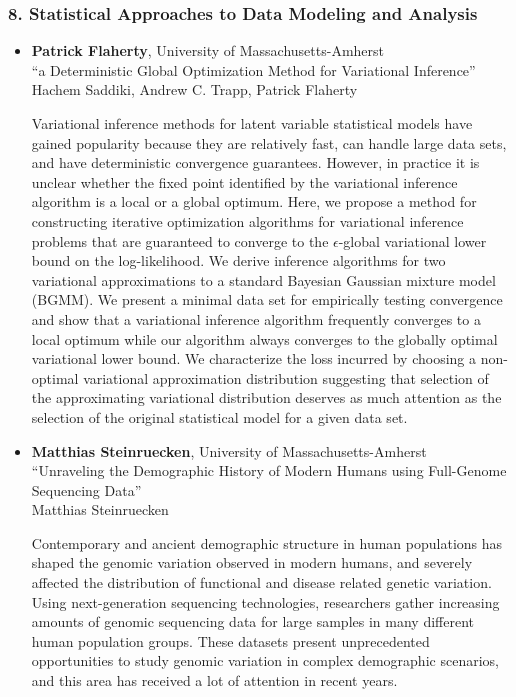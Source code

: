 \subsubsection*{8. Statistical Approaches to Data Modeling and Analysis}

\begin{itemize}
\item \textbf{Patrick Flaherty}, University of Massachusetts-Amherst \\
``a Deterministic Global Optimization Method for Variational Inference'' \\
Hachem Saddiki, Andrew C. Trapp, Patrick Flaherty


Variational inference methods for latent variable statistical models have gained popularity because they are relatively fast, can handle large data sets, and have deterministic convergence guarantees.
However, in practice it is unclear whether the fixed point identified by the variational inference algorithm is a local or a global optimum.
Here, we propose a method for constructing iterative optimization algorithms for variational inference problems that are guaranteed to converge to the $\epsilon$-global variational lower bound on the log-likelihood.
We derive inference algorithms for two variational approximations to a standard Bayesian Gaussian mixture model (BGMM).
We present a minimal data set for empirically testing convergence and show that a variational inference algorithm frequently converges to a local optimum while our algorithm always converges to the globally optimal variational lower bound.
We characterize the loss incurred by choosing a non-optimal variational approximation distribution suggesting that selection of the approximating variational distribution deserves as much attention as the selection of the original statistical model for a given data set.

\item \textbf{Matthias Steinruecken}, University of Massachusetts-Amherst \\
``Unraveling the Demographic History of Modern Humans using Full-Genome Sequencing Data'' \\
Matthias Steinruecken


Contemporary and ancient demographic structure in human populations has shaped the genomic variation observed in modern humans, and severely affected the distribution of functional and disease related genetic variation. Using next-generation sequencing technologies, researchers gather increasing amounts of genomic sequencing data for large samples in many different human population groups. These datasets present unprecedented opportunities to study genomic variation in complex demographic scenarios, and this area has received a lot of attention in recent years.



\end{itemize}
